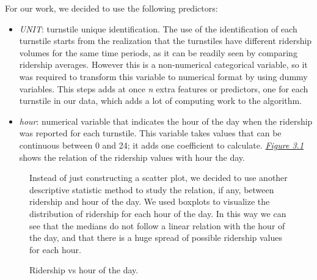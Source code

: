 \documentclass[a4paper,12pt,english]{sphinxmanual}
\begin{document}
For our work, we decided to use the following predictors:
\begin{itemize}
\item {} 
\emph{UNIT}: turnstile unique identification. The use of the identification
of each turnstile starts from the realization that the turnstiles have different
ridership volumes for the same time periods, as it can be readily seen by
comparing ridership averages. However this is a non-numerical categorical
variable, so it was required to transform this variable to numerical format
by using dummy variables. This steps adds at once \emph{n} extra features or predictors,
one for each turnstile in our data, which adds a lot of computing work to the
algorithm.

\item {} 
\emph{hour}: numerical variable that indicates the hour of the day when the ridership
was reported for each turnstile. This variable takes values that can be continuous
between 0 and 24; it adds one coefficient to calculate. {\hyperref[section2:figure31]{\emph{Figure 3.1}}}
shows the relation of the ridership values with hour the day.

\end{itemize}
\begin{figure}[htbp]
\centering
\capstart

\caption{Ridership vs hour of the day.}{\small 
Instead of just constructing a scatter plot, we decided to use another descriptive
statistic method to study the relation, if any, between ridership and hour of
the day. We used boxplots to visualize the distribution of ridership for each
hour of the day. In this way we can see that the medians do not follow a
linear relation with the hour of the day, and that there is a huge spread
of possible ridership values for each hour.
}\label{section2:figure31}\end{figure}
\end{document}
